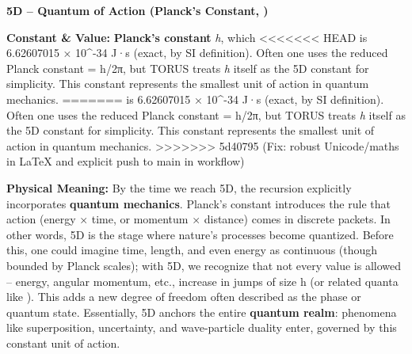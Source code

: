 \documentclass[]{article}
\begin{document}
\textbf{5D -- Quantum of Action (Planck's Constant, \hbar)}

\textbf{Constant \& Value:} \textbf{Planck's constant} \emph{h}, which
<<<<<<< HEAD
is 6.62607015 × 10\^{}-34 J·s (exact, by SI definition)\hspace{0pt}.
Often one uses the reduced Planck constant \hbar = h/2π, but TORUS treats
\emph{h} itself as the 5D constant for simplicity. This constant
represents the smallest unit of action in quantum mechanics.
=======
is 6.62607015 × 10\^{}-34 J·s (exact, by SI definition)​. Often one uses
the reduced Planck constant \hbar = h/2π, but TORUS treats \emph{h} itself
as the 5D constant for simplicity. This constant represents the smallest
unit of action in quantum mechanics.
>>>>>>> 5d40795 (Fix: robust Unicode/maths in LaTeX and explicit push to main in workflow)

\textbf{Physical Meaning:} By the time we reach 5D, the recursion
explicitly incorporates \textbf{quantum mechanics}. Planck's constant
introduces the rule that action (energy × time, or momentum × distance)
comes in discrete packets. In other words, 5D is the stage where
nature's processes become quantized​. Before this, one could imagine
time, length, and even energy as continuous (though bounded by Planck
scales); with 5D, we recognize that not every value is allowed --
energy, angular momentum, etc., increase in jumps of size h (or related
quanta like \hbar). This adds a new degree of freedom often described as the
phase or quantum state. Essentially, 5D anchors the entire
\textbf{quantum realm}: phenomena like superposition, uncertainty, and
wave-particle duality enter, governed by this constant unit of action.
\end{document}
